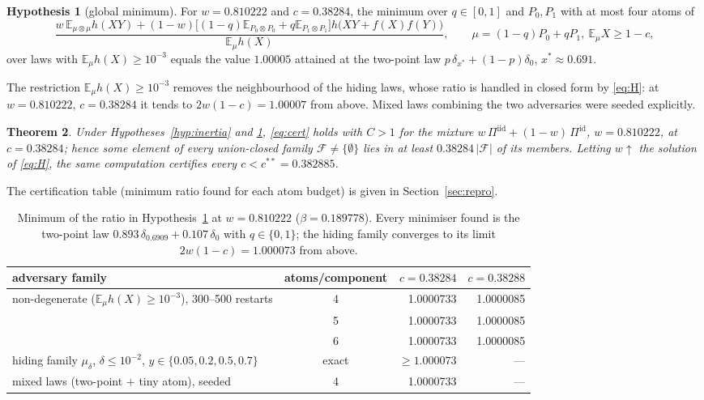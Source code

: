 \documentclass[11pt]{article}
\newtheorem{theorem}{Theorem}
\theoremstyle{definition}
\newtheorem{hypothesis}[theorem]{Hypothesis}
\newcommand{\E}{\mathbb{E}}
\newcommand{\F}{\mathcal{F}}
\newcommand{\ent}{h}
\begin{document}
\begin{hypothesis}[global minimum]\label{hyp:global}
For $w=0.810222$ and $c=0.38284$, the minimum over $q\in[0,1]$ and $P_0,P_1$ with at most four atoms of
\[\frac{w\,\E_{\mu\otimes\mu}\ent(XY)+(1-w)\big[(1-q)\E_{P_0\otimes P_0}+q\E_{P_1\otimes P_1}\big]\ent\big(XY+f(X)f(Y)\big)}{\E_\mu\ent(X)},\qquad \mu=(1-q)P_0+qP_1,\ \E_\mu X\ge1-c,\]
over laws with $\E_\mu\ent(X)\ge10^{-3}$ equals the value $1.00005$ attained at the two-point law $p\,\delta_{x^*}+(1-p)\delta_0$, $x^*\approx0.691$.
\end{hypothesis}
The restriction $\E_\mu\ent(X)\ge10^{-3}$ removes the neighbourhood of the hiding laws, whose ratio is handled in closed form by \eqref{eq:H}: at $w=0.810222$, $c=0.38284$ it tends to $2w(1-c)=1.00007$ from above. Mixed laws combining the two adversaries were seeded explicitly.

\begin{theorem}\label{thm:attain}
Under Hypotheses~\ref{hyp:inertia} and \ref{hyp:global}, \eqref{eq:cert} holds with $C>1$ for the mixture $w\,\Pi^{\mathrm{iid}}+(1-w)\,\Pi^{\mathrm{id}}$, $w=0.810222$, at $c=0.38284$; hence some element of every union-closed family $\F\ne\{\emptyset\}$ lies in at least $0.38284\,|\F|$ of its members. Letting $w\uparrow$ the solution of \eqref{eq:H}, the same computation certifies every $c<c^{**}=0.382885$.
\end{theorem}

The certification table (minimum ratio found for each atom budget) is given in Section~\ref{sec:repro}.

\begin{table}[h]\centering\small
\begin{tabular}{lcrr}\toprule
adversary family & atoms/component & $c=0.38284$ & $c=0.38288$\\\midrule
non-degenerate ($\E_\mu\ent(X)\ge10^{-3}$), 300--500 restarts & 4 & 1.0000733 & 1.0000085\\
 & 5 & 1.0000733 & 1.0000085\\
 & 6 & 1.0000733 & 1.0000085\\
hiding family $\mu_\delta$, $\delta\le10^{-2}$, $y\in\{0.05,0.2,0.5,0.7\}$ & exact & $\ge1.000073$ & ---\\
mixed laws (two-point $+$ tiny atom), seeded & 4 & 1.0000733 & ---\\\bottomrule
\end{tabular}
\caption{Minimum of the ratio in Hypothesis~\ref{hyp:global} at $w=0.810222$ ($\beta=0.189778$). Every minimiser found is the two-point law $0.893\,\delta_{0.6909}+0.107\,\delta_0$ with $q\in\{0,1\}$; the hiding family converges to its limit $2w(1-c)=1.000073$ from above.}
\end{table}
\end{document}
